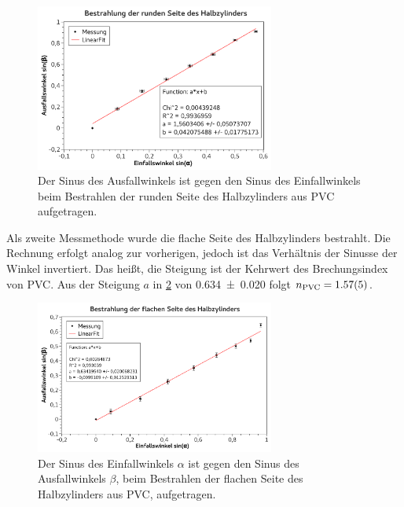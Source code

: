 \documentclass[
	a4paper,
	12pt,
	pagesize,
	ngerman
]{scrartcl}
\begin{document}
	\begin{figure}[H]
		\includegraphics[width=0.7\textwidth]{fig_rund_zyl}
		\centering
		\caption{Der Sinus des Ausfallwinkels ist gegen den Sinus des Einfallwinkels beim Bestrahlen der runden Seite des Halbzylinders aus PVC aufgetragen.}
		\label{fig_rund_zyl}
		\centering
	\end{figure}

	Als zweite Messmethode wurde die flache Seite des Halbzylinders bestrahlt.
	Die Rechnung erfolgt analog zur vorherigen, jedoch ist das Verhältnis der Sinusse der Winkel invertiert.
	Das heißt, die Steigung ist der Kehrwert des Brechungsindex von PVC.
	Aus der Steigung $a$ in \cref{fig_flach_zyl} von \SI{0,634+-0,020}{} folgt $n_\text{PVC} = \SI{1,57 +- 0,05}{}$.
	\begin{figure}[H]
		\includegraphics[width=0.7\textwidth]{fig_flach_zyl}
		\centering
		\caption{Der Sinus des Einfallwinkels $\alpha$ ist gegen den Sinus des Ausfallwinkels $\beta$, beim Bestrahlen der flachen Seite des Halbzylinders aus PVC, aufgetragen.}
		\label{fig_flach_zyl}
		\centering
	\end{figure}
\end{document}
